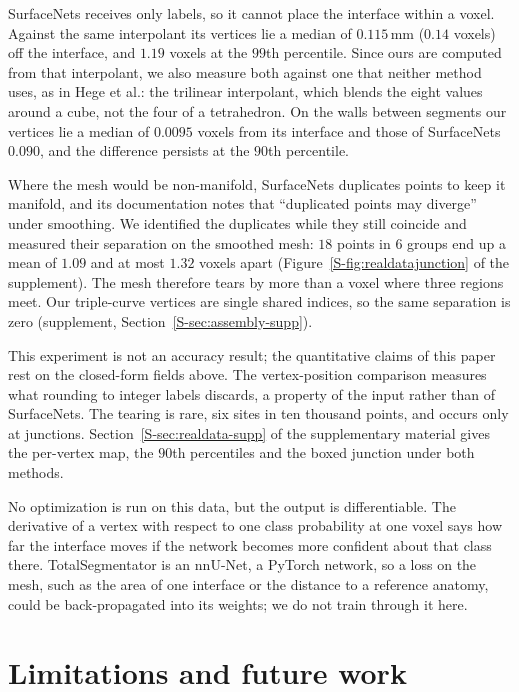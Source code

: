 \documentclass{egpubl}
\newcommand{\sref}[1]{\ref*{S-#1}}
\newcommand{\supp}[1]{Section~\sref{#1} of the supplementary material}
\newcommand{\suppp}[1]{supplement, Section~\sref{#1}}
\theoremstyle{definition}
\begin{document}
SurfaceNets receives only labels, so it cannot place
the interface within a voxel. Against the same
interpolant its vertices lie a median of $0.115$\,mm ($0.14$ voxels) off the
interface, and $1.19$ voxels at the $99$th percentile. Since ours are
computed from that interpolant, we also measure both against one that neither
method uses, as in Hege et al.: the trilinear interpolant, which blends the
eight values around a cube, not the four of a tetrahedron. On the walls between segments our vertices
lie a median of $0.0095$ voxels from its interface and those of SurfaceNets
$0.090$, and the difference persists at the $90$th percentile.

Where the mesh would be non-manifold, SurfaceNets duplicates
points to keep it manifold, and its documentation notes that ``duplicated
points may diverge'' under smoothing. We identified the duplicates while they
still coincide and measured their separation on the smoothed mesh: $18$ points
in $6$ groups end up a mean of $1.09$ and at most $1.32$ voxels apart
(Figure~\sref{fig:realdatajunction} of the supplement). The mesh therefore
tears by more than a voxel where three regions meet. Our triple-curve vertices
are single shared indices, so the same separation is zero
(\suppp{sec:assembly-supp}).

This experiment is not an accuracy result;
the quantitative claims of this paper rest on the closed-form fields above.
The vertex-position comparison measures what rounding to integer labels
discards, a property of the input rather than of SurfaceNets. The tearing is
rare, six sites in ten thousand points, and occurs only at junctions.
\supp{sec:realdata-supp} gives the
per-vertex map, the $90$th percentiles and the boxed junction under both
methods.

No optimization is run on this data, but the output is
differentiable. The derivative of a vertex with respect to one class
probability at one voxel says how far the interface moves if the network
becomes more confident about that class there. TotalSegmentator is an nnU-Net,
a PyTorch network, so a loss on the mesh, such as the area of one interface or
the distance to a reference anatomy, could be back-propagated into its
weights; we do not train through it here.



\section{Limitations and future work}
\label{sec:limitations}
\end{document}
